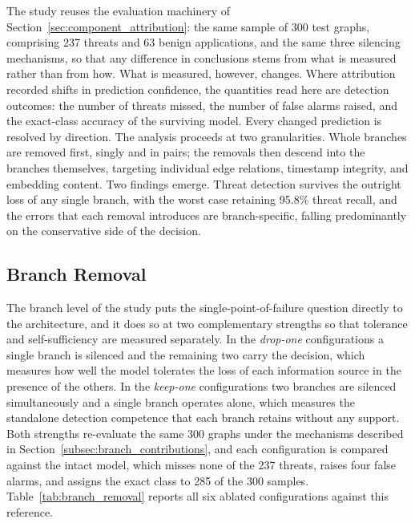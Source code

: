 \documentclass[%
    BCOR=10mm,
    DIV=13,
    toc=bibliography,
    toc=listof,
    oneside,
    12pt,
]{scrbook}
\begin{document}
The study reuses the evaluation machinery of
Section~\ref{sec:component_attribution}: the same sample of 300 test graphs,
comprising 237 threats and 63 benign applications, and the same three
silencing mechanisms, so that any difference in conclusions stems from what is
measured rather than from how. What is measured, however, changes. Where
attribution recorded shifts in prediction confidence, the quantities read
here are detection outcomes: the number of threats missed, the number of
false alarms raised, and the exact-class accuracy of the surviving model.
Every changed prediction is resolved by direction. The analysis proceeds at
two granularities. Whole branches are removed first, singly and in pairs; the
removals then descend into the branches themselves, targeting individual edge
relations, timestamp integrity, and embedding content. Two findings emerge.
Threat
detection survives the outright loss of any single branch, with the worst
case retaining 95.8\% threat recall, and the errors that each removal
introduces are branch-specific, falling predominantly on the conservative
side of the decision.

\subsection{Branch Removal}
\label{subsec:branch_removal}

The branch level of the study puts the single-point-of-failure question
directly to the architecture, and it does so at two complementary strengths
so that tolerance and self-sufficiency are measured separately. In the
\emph{drop-one} configurations a single branch is silenced and the remaining
two carry the decision, which measures how well the model tolerates the
loss of each information source in the presence of the others. In the
\emph{keep-one} configurations two branches are silenced simultaneously and a
single branch operates alone, which measures the standalone detection
competence that each branch retains without any support. Both strengths
re-evaluate the same 300 graphs under the mechanisms described in
Section~\ref{subsec:branch_contributions}, and each configuration is compared
against the intact model, which misses none of the 237 threats, raises four
false alarms, and assigns the exact class to 285 of the 300 samples.
Table~\ref{tab:branch_removal} reports all six ablated configurations
against this reference.
\end{document}
